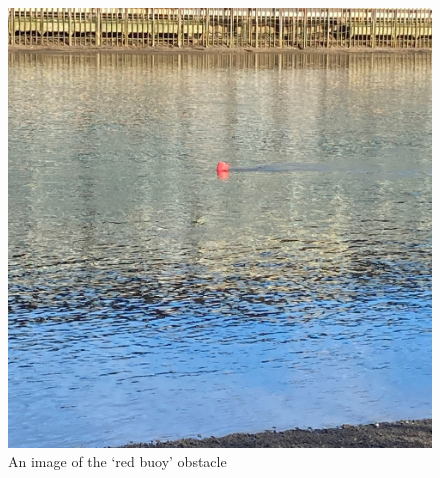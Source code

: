 \documentclass[10pt, a4paper]{article}
\begin{document}
\begin{figure}[h]
\caption{An image of the `red buoy' obstacle}
\begin{center}
\includegraphics[scale=0.1]{buoy2.jpg}
\end{center}
\end{figure}
\FloatBarrier
\end{document}
